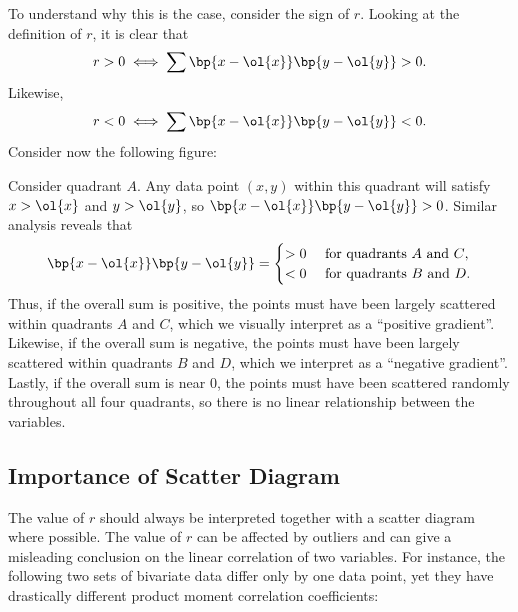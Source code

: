 To understand why this is the case, consider the sign of $r$. Looking at the definition of $r$, it is clear that \[r > 0 \iff \sum \bp{x - \ol{x}}\bp{y - \ol{y}} > 0.\] Likewise, \[r < 0 \iff \sum \bp{x - \ol{x}}\bp{y - \ol{y}} < 0.\] Consider now the following figure:

\begin{figure}[H]
\centering
{}
\caption{}
\end{figure}

Consider quadrant $A$. Any data point $(x, y)$ within this quadrant will satisfy $x > \ol{x}$ and $y > \ol{y}$, so $\bp{x - \ol{x}}\bp{y - \ol{y}} > 0$. Similar analysis reveals that \[\bp{x - \ol{x}}\bp{y - \ol{y}} = \begin{cases}>0 & \text{ for quadrants $A$ and $C$},\\<0 & \text{ for quadrants $B$ and $D$}.\end{cases}\] Thus, if the overall sum is positive, the points must have been largely scattered within quadrants $A$ and $C$, which we visually interpret as a ``positive gradient''. Likewise, if the overall sum is negative, the points must have been largely scattered within quadrants $B$ and $D$, which we interpret as a ``negative gradient''. Lastly, if the overall sum is near 0, the points must have been scattered randomly throughout all four quadrants, so there is no linear relationship between the variables.

\subsection{Importance of Scatter Diagram}

The value of $r$ should always be interpreted together with a scatter diagram where possible. The value of $r$ can be affected by outliers and can give a misleading conclusion on the linear correlation of two variables. For instance, the following two sets of bivariate data differ only by one data point, yet they have drastically different product moment correlation coefficients:


